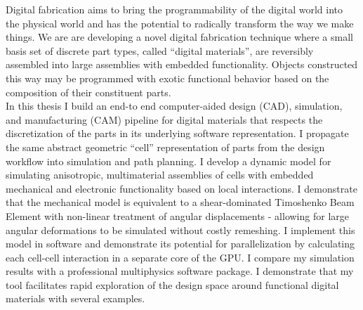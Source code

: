 % 
% 
%

Digital fabrication aims to bring the programmability of the digital world into the physical world and has the potential to radically transform the way we make things.  We are are developing a novel digital fabrication technique where a small basis set of discrete part types, called ``digital materials'', are reversibly assembled into large assemblies with embedded functionality.  Objects constructed this way may be programmed with exotic functional behavior based on the composition of their constituent parts.\\

In this thesis I build an end-to end computer-aided design (CAD), simulation, and manufacturing (CAM) pipeline for digital materials that respects the discretization of the parts in its underlying software representation.  I propagate the same abstract geometric ``cell'' representation of parts from the design workflow into simulation and path planning.  I develop a dynamic model for simulating anisotropic, multimaterial assemblies of cells with embedded mechanical and electronic functionality based on local interactions.  I demonstrate that the mechanical model is equivalent to a shear-dominated Timoshenko Beam Element with non-linear treatment of angular displacements - allowing for large angular deformations to be simulated without costly remeshing.  I implement this model in software and demonstrate its potential for parallelization by calculating each cell-cell interaction in a separate core of the GPU.  I compare my simulation results with a professional multiphysics software package.  I demonstrate that my tool facilitates rapid exploration of the design space around functional digital materials with several examples.
